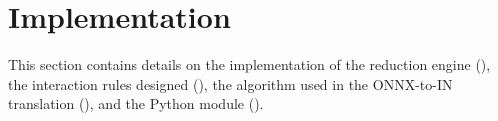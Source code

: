 \section{Implementation}
\label{sec:implementation}

This section contains details on the implementation of the reduction engine (\textbf{}),
the interaction rules designed (\textbf{}), the algorithm used in the
ONNX-to-IN translation (\textbf{}), and the Python module (\textbf{}).








